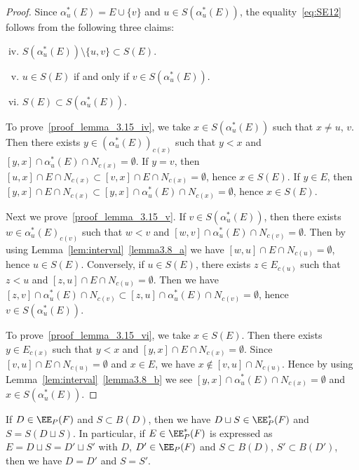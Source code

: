 \begin{proof}
Since $\alpha^*_u(E) = E \cup \{ v \}$ and 
$u\in S(\alpha^*_u(E))$, the equality~\eqref{eq:SE12} 
follows from the following three claims:
\begin{enumerate}[(i)]\setcounter{enumi}{3}
\item\label{proof_lemma_3.15_iv} %
$S(\alpha^*_u(E)) \setminus \{ u, v \} \subset S(E)$.
\item\label{proof_lemma_3.15_v} %
$u \in S(E)$ if and only if $v \in S(\alpha^*_u(E))$.
\item\label{proof_lemma_3.15_vi} %
$S(E) \subset S(\alpha^*_u(E))$.
\end{enumerate}

To prove~\ref{proof_lemma_3.15_iv}, we take $x \in S(\alpha^*_u(E))$ such that $x \neq u$, $v$.
Then there exists $y \in (\alpha^*_u(E))_{c(x)}$ such that $y<x$ 
and $[y,x] \cap \alpha^*_u(E) \cap N_{c(x)} = \emptyset$.
If $y = v$, then $[u,x] \cap E \cap N_{c(x)} \subset [v,x] \cap E \cap N_{c(x)} = \emptyset$, 
hence $x \in S(E)$.
If $y \in E$, then $[y,x] \cap E \cap N_{c(x)} \subset [y,x] \cap \alpha^*_u(E) \cap N_{c(x)} = \emptyset$, 
hence $x \in S(E)$.

Next we prove~\ref{proof_lemma_3.15_v}.
If $v \in S(\alpha^{*}_u(E))$, then there exists $w \in \alpha^*_u(E)_{c(v)}$ such that
$w<v$ and $[w,v] \cap \alpha^*_u(E) \cap N_{c(v)} = \emptyset$.
Then by using Lemma~\ref{lem:interval}~\ref{lemma3.8_a} we have $[w,u] \cap E \cap N_{c(u)} = \emptyset$, 
hence $u \in S(E)$.
Conversely, if $u \in S(E)$, there exists $z \in E_{c(u)}$ such that $z<u$ and 
$[z,u] \cap E \cap N_{c(u)} = \emptyset$.
Then we have $[z,v] \cap \alpha^*_u(E) \cap N_{c(v)} \subset [z,u] \cap \alpha^*_u(E) \cap N_{c(v)} = \emptyset$, 
hence $v \in S(\alpha^*_u(E))$.

To prove~\ref{proof_lemma_3.15_vi}, we take $x \in S(E)$.
Then there exists $y \in E_{c(x)}$ such that $y < x$ and $[y,x] \cap E \cap N_{c(x)} = \emptyset$.
Since $[v,u] \cap E \cap N_{c(u)} = \emptyset$ and $x \in E$, we have $x \not\in [v,u] \cap N_{c(u)}$.
Hence by using Lemma~\ref{lem:interval}~\ref{lemma3.8_b} we see $[y,x] \cap \alpha^*_u(E) \cap N_{c(x)} = \emptyset$ 
and $x \in S(\alpha^*_u(E))$.
\end{proof}

\begin{lemm}
\label{lem:SE2}
If $D \in \EE_P(F)$ and $S \subset B(D)$, 
then we have $D \sqcup S \in \EE^*_P(F)$ and $S = S(D \sqcup S)$.
In particular, if $E \in \EE^*_P(F)$ is expressed as $E = D \sqcup S = D' \sqcup S'$ 
with $D$, $D' \in \EE_P(F)$ and $S \subset B(D)$, $S' \subset B(D')$, then we have 
$D = D'$ and $S = S'$.
\end{lemm}

